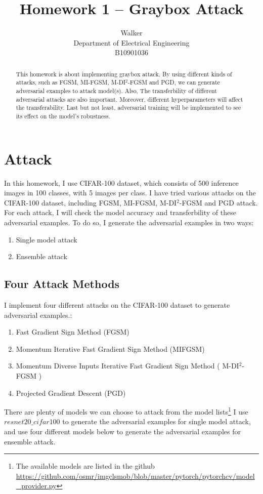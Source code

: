 \documentclass{article}
\title{Homework 1 -- Graybox Attack}
\author{%
  Walker \\
  Department of Electrical Engineering \\
  B10901036 \\
}
\newcommand {\DIFGSM} {
  M-DI$^{2}$-FGSM
}
\begin{document}
\maketitle


\begin{abstract}
  This homework is about implementing graybox attack.
  By using different kinds of attacks, such as FGSM, MI-FGSM, \DIFGSM and PGD, we can generate adversarial examples to attack model(s).
  Also, The transferbility of different adversarial attacks are also important.
  Moreover, different hyperparameters will affect the transferability.
  Last but not least, adversarial training will be implemented to see its effect on the model's robustness.
\end{abstract}

\section{Attack}
In this homework, I use CIFAR-100 dataset, which consists of 500 inference images in 100 classes, with 5 images per class.
I have tried various attacks on the CIFAR-100 dataset, including FGSM, MI-FGSM, \DIFGSM and PGD attack.
For each attack, I will check the model accuracy and transferbility of these adversarial examples.
To do so, I generate the adversarial examples in two ways:

\begin{enumerate}
    \item Single model attack
    \item Ensemble attack
\end{enumerate}

\subsection{Four Attack Methods}
I implement four different attacks on the CIFAR-100 dataset to generate adversarial examples.:

\begin{enumerate}
  \item Fast Gradient Sign Method (FGSM)
  \item Momentum Iterative Fast Gradient Sign Method (MIFGSM)
  \item Momentum Diverse Inputs Iterative Fast Gradient Sign Method (\DIFGSM)
  \item Projected Gradient Descent (PGD)
\end{enumerate}

There are plenty of models we can choose to attack from the model lists\footnote{The available models are listed in the github \url{https://github.com/osmr/imgclsmob/blob/master/pytorch/pytorchcv/model_provider.py} }
I use $resnet20\_cifar100$ to generate the adversarial examples for single model attack,
and use four different models below to generate the adversarial examples for ensemble attack.
\end{document}
